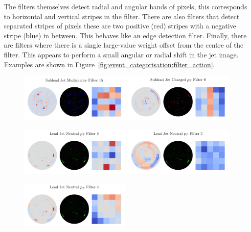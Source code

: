 The filters themselves detect radial and angular bands of pixels, this corresponds to horizontal and vertical stripes in the filter. 
There are also filters that detect separated stripes of pixels these are two positive (red) stripes with a negative stripe (blue) in between. This behaves like an edge detection filter. 
Finally, there are filters where there is a single large-value weight offset from the centre of the filter. This appears to perform a small angular or radial shift in the jet image. 
Examples are shown in Figure~\ref{fig:event_categorisation:filter_action}.
\begin{figure}[h!]
    \begin{center}
        \includegraphics[width=0.49\textwidth]{figures/event_selection/ggh_firstconv_5_15.pdf}
        \includegraphics[width=0.49\textwidth]{figures/event_selection/ggh_firstconv_3_9.pdf}
    \end{center}
    \begin{center}
        \includegraphics[width=0.49\textwidth]{figures/event_selection/ggh_firstconv_1_6.pdf}
        \includegraphics[width=0.49\textwidth]{figures/event_selection/ggh_firstconv_1_3.pdf}
    \end{center}
    \begin{center}
        \includegraphics[width=0.49\textwidth]{figures/event_selection/ggh_firstconv_1_4.pdf}

\end{center}
\end{figure}
